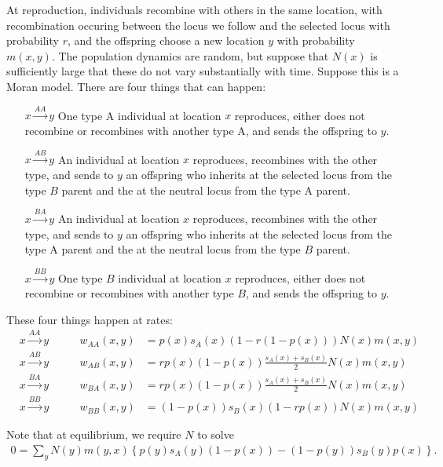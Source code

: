 \documentclass[11pt,letterpaper]{article}
\begin{document}
At reproduction, individuals recombine with others in the same location,
with recombination occuring between the locus we follow and the selected locus with probability $r$,
and the offspring choose a new location $y$ with probability $m(x,y)$.
The population dynamics are random, 
but suppose that $N(x)$ is sufficiently large that these do not vary substantially with time.
Suppose this is a Moran model.
There are four things that can happen:
\begin{enumerate}
    \item[$x\xrightarrow{AA}y$] One type A individual at location $x$ reproduces, 
        either does not recombine or recombines with another type A,
        and sends the offspring to $y$.
    \item[$x\xrightarrow{AB}y$] An individual at location $x$ reproduces, 
        recombines with the other type,
        and sends to $y$ an offspring
        who inherits at the selected locus from the type $B$ parent 
        and the at the neutral locus from the type A parent.
    \item[$x\xrightarrow{BA}y$] An individual at location $x$ reproduces, 
        recombines with the other type,
        and sends to $y$ an offspring
        who inherits at the selected locus from the type A parent 
        and the at the neutral locus from the type $B$ parent.
    \item[$x\xrightarrow{BB}y$] One type $B$ individual at location $x$ reproduces, 
        either does not recombine or recombines with another type $B$,
        and sends the offspring to $y$.
\end{enumerate}
These four things happen at rates:
\begin{align}
    & x\xrightarrow{AA}y & \qquad w_{AA}(x,y) &= p(x) s_A(x) \left(1 - r (1-p(x)) \right)  N(x) m(x,y) \\
    & x\xrightarrow{AB}y & \qquad w_{AB}(x,y) &= r p(x) (1-p(x)) \frac{s_A(x)+s_B(x)}{2} N(x) m(x,y) \\
    & x\xrightarrow{BA}y & \qquad w_{BA}(x,y) &= r p(x) (1-p(x)) \frac{s_A(x)+s_B(x)}{2} N(x) m(x,y) \\
    & x\xrightarrow{BB}y & \qquad w_{BB}(x,y) &= (1-p(x)) s_B(x) \left(1 - r p(x) \right) N(x) m(x,y) 
\end{align}

Note that at equilibrium, we require $N$ to solve
\begin{align}
  0 = \sum_y N(y) m(y,x) \left\{ p(y)s_A(y)(1-p(x)) - (1-p(y))s_B(y)p(x) \right\} .
\end{align}
\end{document}

